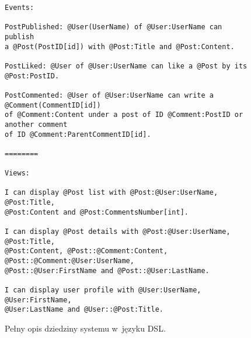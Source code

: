\begin{figure}[!ht]
\begin{verbatim}
Events:

PostPublished: @User(UserName) of @User:UserName can publish
a @Post(PostID[id]) with @Post:Title and @Post:Content.

PostLiked: @User of @User:UserName can like a @Post by its @Post:PostID.

PostCommented: @User of @User:UserName can write a @Comment(CommentID[id])
of @Comment:Content under a post of ID @Comment:PostID or another comment
of ID @Comment:ParentCommentID[id].

========

Views:

I can display @Post list with @Post:@User:UserName, @Post:Title,
@Post:Content and @Post:CommentsNumber[int].

I can display @Post details with @Post:@User:UserName, @Post:Title,
@Post:Content, @Post::@Comment:Content, @Post::@Comment:@User:UserName,
@Post::@User:FirstName and @Post::@User:LastName.

I can display user profile with @User:UserName, @User:FirstName,
@User:LastName and @User::@Post:Title.

\end{verbatim}
\caption{
 Pełny opis dziedziny systemu w~języku DSL.
}
\label{fig:single:model_dsl}
\end{figure}
